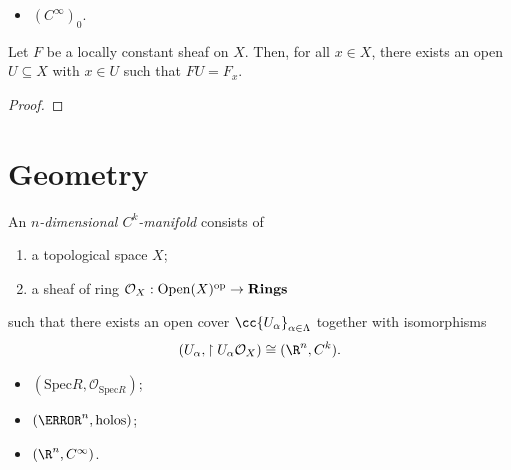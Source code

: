 \documentclass{article}
\begin{document}
\begin{example}
  \begin{itemize}
  \item $(C^\infty)_0$.
  \end{itemize}
\end{example}

\begin{lemma}
  Let $F$ be a locally constant sheaf on $X$. Then, for all $x\in X$, there exists
  an open $U\subseteq X$ with $x\in U$ such that $FU=F_x$.
  \begin{proof}
    \missingproof
  \end{proof}
\end{lemma}

\section{Geometry}

\begin{definition}
  An \emph{$n$-dimensional $C^k$-manifold} consists of
  \begin{enumerate}
    \item a topological space $X$;
    \item a sheaf of ring $\mathcal O_X:\operatorname{Open}(X)^{\text{op}}\to\textbf{Rings}$
  \end{enumerate}
  such that there exists an open cover $\cc{U_\alpha}_{\alpha\in\Lambda}$
  together with isomorphisms
  \begin{align*}
    (U_\alpha,\restriction{U_\alpha}{\mathcal O_X})\cong (\R^n,C^k).
  \end{align*}
\end{definition}

\begin{example}
  \begin{itemize}
    \item $(\text{Spec} R,\mathcal O_{\text{Spec} R})$;
    \item $(\C^n, \text{holos})$;
    \item $(\R^n, C^\infty)$.
  \end{itemize}
\end{example}

\printbibliography
\end{document}
